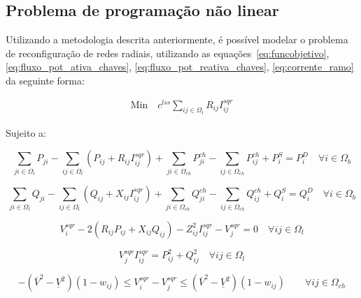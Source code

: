 \subsection{Problema de programação não linear}

Utilizando a metodologia descrita anteriormente, é possível modelar o problema de reconfiguração de redes radiais, utilizando as equações~\ref{eq:funcobjetivo}, \ref{eq:fluxo_pot_ativa_chaves}, \ref{eq:fluxo_pot_reativa_chaves}, \ref{eq:corrente_ramo} da seguinte forma:


\begin{tcolorbox}[enhanced jigsaw,breakable,pad at break*=1mm,colback=white!10,title =\textbf{Problema de PLIM para RSD}]

\begin{align*}\label{eq:NL_funcobj}
    \text{Min}\quad c^{lss}\sum_{ij\in\Omega_l}R_{ij}I_{ij}^{sqr}
\end{align*}

Sujeito a:

\begin{equation*}\label{eq:NL_PA}
    \sum_{ji\in\Omega_{l}}P_{ji} - \sum_{ij\in\Omega_{l}}(P_{ij} + R_{ij}I_{ij}^{sqr})+ \sum_{ji\in\Omega_{ch}}P_{ji}^{ch} -\sum_{ij\in\Omega_{ch}}P_{ij}^{ch} + P_{i}^{S} = P_{i}^{D}\quad\forall i \in\Omega_{b}  
\end{equation*}

\begin{equation*}\label{eq:NL_PR}
    \sum_{ji\in\Omega_{l}}Q_{ji} - \sum_{ij\in\Omega_{l}}(Q_{ij} + X_{ij}I_{ij}^{sqr})+ \sum_{ji\in\Omega_{ch}}Q_{ji}^{ch} -\sum_{ij\in\Omega_{ch}}Q_{ij}^{ch} + Q_{i}^{S} = Q_{i}^{D}\quad\forall i \in\Omega_{b}
\end{equation*}

\begin{equation*}\label{eq:NL_voltage}
    V_{i}^{sqr} - 2(R_{ij}P_{ij} + X_{ij}Q_{ij}) - Z_{ij}^{2}I_{ij}^{sqr} - V_{j}^{sqr} = 0\quad\forall ij \in \Omega_{l}
\end{equation*}

\begin{equation*}\label{eq:NL_power}
    V_{j}^{sqr}I_{ij}^{sqr} = P_{ij}^{2}+Q_{ij}^{2}\quad\forall ij \in \Omega_{l}
\end{equation*}

\begin{equation*}\label{eq:NL_voltagekeys}
    -(\overline{V}^{2} - \underline{V}^{2})(1-w_{ij}) \leq V_{i}^{sqr} - V_{j}^{sqr} \leq (\overline{V}^{2} - \underline{V}^{2})(1-w_{ij})\qquad\forall ij\in\Omega_{ch}
\end{equation*}
    

\end{tcolorbox}
